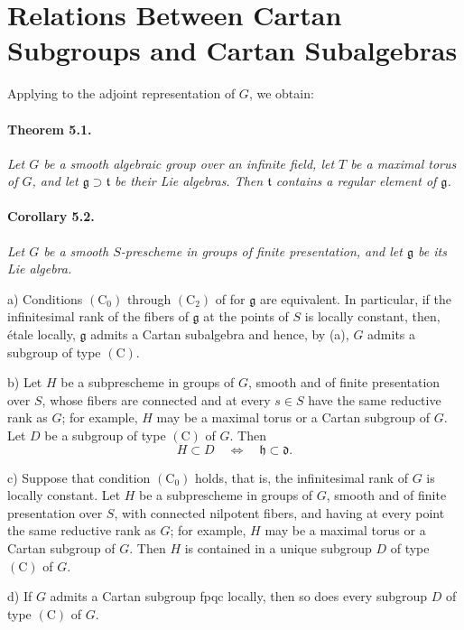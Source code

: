 
\section{Relations Between Cartan Subgroups and Cartan Subalgebras}

Applying  to the adjoint representation of \(G\), we obtain:

\paragraph{\textbf{Theorem 5.1.}}
{\itshape Let \(G\) be a smooth algebraic group over an infinite
field, let \(T\) be a maximal torus of \(G\), and let
\(\mathfrak g\supset\mathfrak t\) be their Lie algebras. Then
\(\mathfrak t\) contains a regular element of \(\mathfrak g\).}

\paragraph{\textbf{Corollary 5.2.}}
{\itshape Let \(G\) be a smooth \(S\)-prescheme in groups of finite
presentation, and let \(\mathfrak g\) be its Lie algebra.

\smallskip
\noindent
\textup{a)} Conditions \((\mathrm C_0)\) through \((\mathrm C_2)\)
of  for \(\mathfrak g\) are equivalent. In particular, if the
infinitesimal rank of the fibers of \(\mathfrak g\) at the points
of \(S\) is locally constant, then, étale locally,
\(\mathfrak g\) admits a Cartan subalgebra and hence, by
\textup{(a)}, \(G\) admits a subgroup of type \((\mathrm C)\).

\smallskip
\noindent
\textup{b)} Let \(H\) be a subprescheme in groups of \(G\), smooth
and of finite presentation over \(S\), whose fibers are connected
and at every \(s\in S\) have the same reductive rank as \(G\);
for example, \(H\) may be a maximal torus or a Cartan subgroup of
\(G\). Let \(D\) be a subgroup of type \((\mathrm C)\) of \(G\).
Then
\[
  H\subset D\quad\Longleftrightarrow\quad
  \mathfrak h\subset\mathfrak d.
\]

\smallskip
\noindent
\textup{c)} Suppose that condition \((\mathrm C_0)\) holds, that is,
the infinitesimal rank of \(G\) is locally constant. Let \(H\) be a
subprescheme in groups of \(G\), smooth and of finite presentation
over \(S\), with connected nilpotent fibers, and having at every
point the same reductive rank as \(G\); for example, \(H\) may be a
maximal torus or a Cartan subgroup of \(G\). Then \(H\) is contained
in a unique subgroup \(D\) of type \((\mathrm C)\) of \(G\).

\smallskip
\noindent
\textup{d)} If \(G\) admits a Cartan subgroup fpqc locally, then so
does every subgroup \(D\) of type \((\mathrm C)\) of \(G\).}

